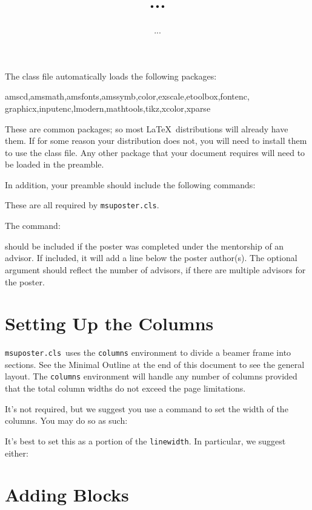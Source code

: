 \documentclass[11pt]{article}
\newcommand{\cls}{\lstinline[basicstyle=\ttfamily]!msuposter.cls!}
\newcommand{\code}[1]{\lstinline[basicstyle=\ttfamily]!#1!}
\begin{document}
The class file automatically loads the following packages:
\begin{tex}
amscd,amsmath,amsfonts,amssymb,color,exscale,etoolbox,fontenc,
graphicx,inputenc,lmodern,mathtools,tikz,xcolor,xparse
\end{tex}
These are common packages; so most \LaTeX\ distributions will already have them.  If for some reason your distribution does not, you will need to install them to use the class file.  Any other package that your document requires will need to be loaded in the preamble.

In addition, your preamble should include the following commands:
\begin{tex}
\title{...}         %
\author{...}        %
\end{tex}
These are all required by \cls.

The command:
\begin{tex}
\end{tex}
should be included if the poster was completed under the mentorship of an advisor.  If included, it will add a line below the poster author(s).  The optional argument should reflect the number of advisors, if there are multiple advisors for the poster.

\section{Setting Up the Columns}

\cls\ uses the \code{columns} environment to divide a beamer frame into sections.  See the Minimal Outline at the end of this document to see the general layout.  The \code{columns} environment will handle any number of columns provided that the total column widths do not exceed the page limitations.

It's not required, but we suggest you use a command to set the width of the columns.  You may do so as such:
\begin{tex}
\newcommand{\colwidth}{...}  %
\end{tex}
It's best to set this as a portion of the \code{linewidth}.  In particular, we suggest either:
\begin{tex}
\newcommand{\colwidth}{0.3\linewidth}   %
\newcommand{\colwidth}{0.22\linewidth}  %
\end{tex}

\section{Adding Blocks}
\end{document}
